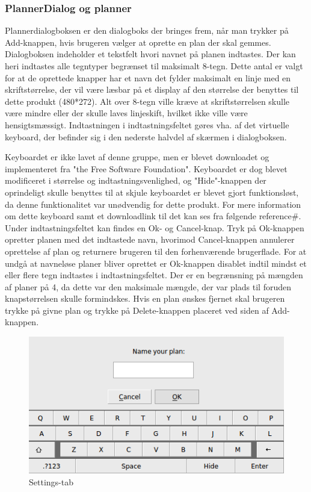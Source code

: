 \subsubsection{PlannerDialog og planner}
Plannerdialogboksen er den dialogboks der bringes frem, når man trykker på Add-knappen, hvis brugeren vælger at oprette en plan der skal gemmes. Dialogboksen indeholder et tekstfelt hvori navnet på planen indtastes. Der kan heri indtastes alle tegntyper begrænset til maksimalt 8-tegn. Dette antal er valgt for at de oprettede knapper har et navn det fylder maksimalt en linje med en skriftstørrelse, der vil være læsbar på et display af den størrelse der benyttes til dette produkt (480*272). Alt over 8-tegn ville kræve at skriftstørrelsen skulle være mindre eller der skulle laves linjeskift, hvilket ikke ville være hensigtsmæssigt. Indtastningen i indtastningsfeltet gøres vha. af det virtuelle keyboard, der befinder sig i den nederste halvdel af skærmen i dialogboksen. 

Keyboardet er ikke lavet af denne gruppe, men er blevet downloadet og implementeret fra "the Free Software Foundation". Keyboardet er dog blevet modificeret i størrelse og indtastningsvenlighed, og "Hide"-knappen der oprindeligt skulle benyttes til at skjule keyboardet er blevet gjort funktionsløst, da denne funktionalitet var unødvendig for dette produkt. For mere information om dette keyboard samt et downloadlink til det kan ses fra følgende reference\#. Under indtastningsfeltet kan findes en Ok- og Cancel-knap. Tryk på Ok-knappen opretter planen med det indtastede navn, hvorimod Cancel-knappen annulerer oprettelse af plan og returnere brugeren til den forhenværende brugerflade. For at undgå at navneløse planer bliver oprettet er Ok-knappen disablet indtil mindst et eller flere tegn indtastes i indtastningsfeltet. Der er en begrænsning på mængden af planer på 4, da dette var den maksimale mængde, der var plads til foruden knapstørrelsen skulle formindskes. Hvis en plan ønskes fjernet skal brugeren trykke på givne plan og trykke på Delete-knappen placeret ved siden af Add-knappen.

\begin{figure}[H]
\centering
\includegraphics[width=0.9\linewidth]{0_Filer/Figuer/plannerDialog.png}
\caption{Settings-tab}
\label{fig:GUI Dialog}
\end{figure}

